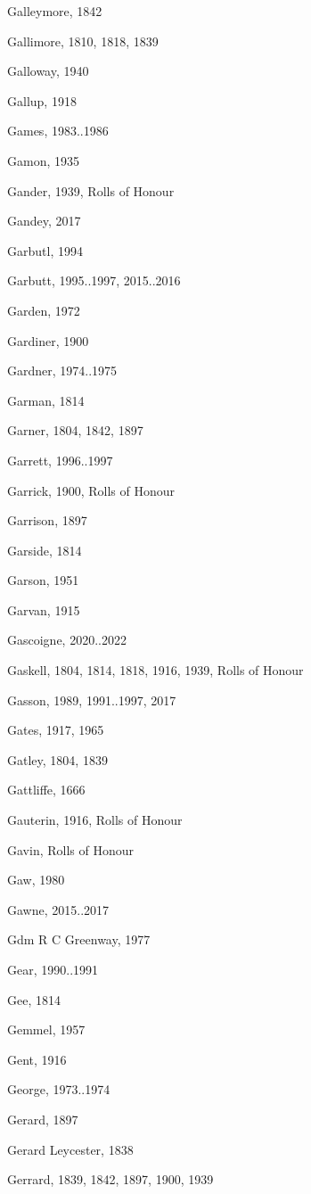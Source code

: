 \begin{theindex}
\item Galleymore, 1842
\item Gallimore, 1810, 1818, 1839
\item Galloway, 1940
\item Gallup, 1918
\item Games, 1983..1986
\item Gamon, 1935
\item Gander, 1939, Rolls of Honour
\item Gandey, 2017
\item Garbutl, 1994
\item Garbutt, 1995..1997, 2015..2016
\item Garden, 1972
\item Gardiner, 1900
\item Gardner, 1974..1975
\item Garman, 1814
\item Garner, 1804, 1842, 1897
\item Garrett, 1996..1997
\item Garrick, 1900, Rolls of Honour
\item Garrison, 1897
\item Garside, 1814
\item Garson, 1951
\item Garvan, 1915
\item Gascoigne, 2020..2022
\item Gaskell, 1804, 1814, 1818, 1916, 1939, Rolls of Honour
\item Gasson, 1989, 1991..1997, 2017
\item Gates, 1917, 1965
\item Gatley, 1804, 1839
\item Gattliffe, 1666
\item Gauterin, 1916, Rolls of Honour
\item Gavin, Rolls of Honour
\item Gaw, 1980
\item Gawne, 2015..2017
\item Gdm R C Greenway, 1977
\item Gear, 1990..1991
\item Gee, 1814
\item Gemmel, 1957
\item Gent, 1916
\item George, 1973..1974
\item Gerard, 1897
\item Gerard Leycester, 1838
\item Gerrard, 1839, 1842, 1897, 1900, 1939

\end{theindex}
